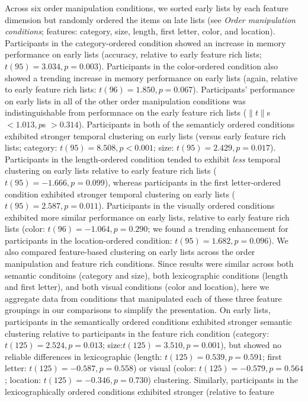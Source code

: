 \documentclass[11pt]{article}
\begin{document}
Across six order manipulation conditions, we sorted early lists by each feature
dimension but randomly ordered the items on late lists (see \textit{Order
manipulation conditions}; features: category, size, length, first letter,
color, and location). Participants in the category-ordered condition showed an
increase in memory performance on early lists (accuracy, relative to early
feature rich lists; $t(95) = 3.034, p = 0.003$). Participants in the
color-ordered condition also showed a trending increase in memory performance
on early lists (again, relative to early feature rich lists: $t(96) = 1.850, p
= 0.067$). Participants' performance on early lists in all of the other order
manipulation conditions was indistinguishable from performnace on the early
feature rich lists ($\|t\|$s $< 1.013, p$s $> 0.314$). Participants in both of
the semanticly ordered conditions exhibited stronger temporal clustering on
early lists (versus early feature rich lists; category: $t(95) = 8.508, p <
0.001$; size: $t(95) = 2.429, p = 0.017$). Participants in the length-ordered
condition tended to exhibit \textit{less} temporal clustering on early lists
relative to early feature rich lists ($t(95) = -1.666, p = 0.099$), whereas
participants in the first letter-ordered condition exhibited stronger temporal
clustering on early lists ($t(95) = 2.587, p = 0.011$). Participants in the
visually ordered conditions exhibited more similar performance on early lists,
relative to early feature rich lists (color: $t(96) = -1.064, p = 0.290$; we
found a trending enhancement for participants in the location-ordered
condition: $t(95) = 1.682, p = 0.096$). We also compared feature-based
clustering on early lists across the order manipulation and feature rich
conditions. Since results were similar across both semantic conditoins
(category and size), both lexicographic conditions (length and first letter),
and both visual conditions (color and location), here we aggregate data from
conditions that manipulated each of these three feature groupings in our
comparisons to simplify the presentation. On early lists, participants in the
semantically ordered conditions exhibited stronger semantic clustering relative
to participants in the feature rich condition (category: $t(125) = 2.524, p =
0.013$; size:$t(125) = 3.510, p = 0.001$), but showed no reliable differences
in lexicographic (length: $t(125) = 0.539, p = 0.591$; first letter: $t(125) =
-0.587, p = 0.558$) or visual (color: $t(125) = -0.579, p = 0.564$; location:
$t(125) = -0.346, p = 0.730$) clustering. Similarly, participants in the
lexicographically ordered conditions exhibited stronger (relative to feature
\end{document}
